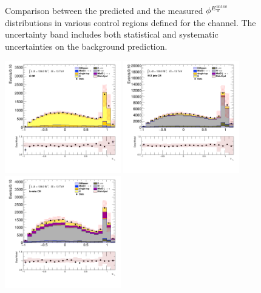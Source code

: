\begin{figure}[!htp]
\begin{center}
			\end{center}
			\caption{
			Comparison between the predicted and the measured $\phi^{E_\text{T}^\text{miss}}$ distributions in various control regions defined for the \taujets channel. The uncertainty band includes both statistical and systematic uncertainties on the background prediction. 
			}
			\label{fig:bkg-met-phi-taujets}
		\end{figure}

		\begin{figure}[!htp]
			\begin{center}    
			\includegraphics[width=0.45\textwidth]{chapters/chapter6_HPlus/images/taujets/tau_0_upsilon_TTBAR.png}
			\includegraphics[width=0.45\textwidth]{chapters/chapter6_HPlus/images/taujets/tau_0_upsilon_WJETS.png} \\
			\includegraphics[width=0.45\textwidth]{chapters/chapter6_HPlus/images/taujets/tau_0_upsilon_BVETO.png}

\end{center}
\end{figure}

